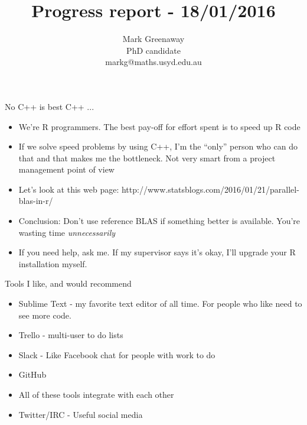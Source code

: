 \documentclass{beamer}
\title{Progress report - 18/01/2016}
\author{Mark Greenaway\\PhD candidate\\markg@maths.usyd.edu.au}
\begin{document}
\begin{frame}
\maketitle
\end{frame}

\begin{frame}{No C++ is best C++ ...}
\begin{itemize}
\item We're R programmers. The best pay-off for effort spent is to speed up R code
\item If we solve speed problems by using C++, I'm the ``only'' person who can do that and that makes me
			the bottleneck. Not very smart from a project management point of view
\item Let's look at this web page: http://www.statsblogs.com/2016/01/21/parallel-blas-in-r/
\item Conclusion: Don't use reference BLAS if something better is available. You're wasting time
			\emph{unnecessarily}
\item If you need help, ask me. If my supervisor says it's okay, I'll upgrade your R installation myself.
\end{itemize}
\end{frame}

\begin{frame}{Tools I like, and would recommend}
\begin{itemize}
\item Sublime Text - my favorite text editor of all time. For people who like need to see more code.
\item Trello - multi-user to do lists
\item Slack - Like Facebook chat for people with work to do
\item GitHub
\item All of these tools integrate with each other
\item Twitter/IRC - Useful social media
\end{itemize}
\end{frame}
\end{document}

